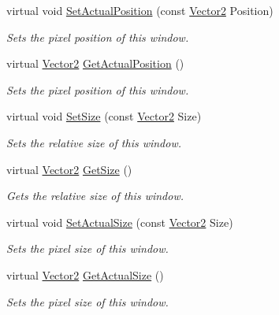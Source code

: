 \begin{DoxyCompactItemize}
virtual void \hyperlink{classphys_1_1UI_1_1Window_a2b8dfb4d8f2c730502ead6d1e8bb10e2}{SetActualPosition} (const \hyperlink{classphys_1_1Vector2}{Vector2} Position)
\begin{DoxyCompactList}\small\item\em Sets the pixel position of this window. \item\end{DoxyCompactList}\item 
virtual \hyperlink{classphys_1_1Vector2}{Vector2} \hyperlink{classphys_1_1UI_1_1Window_a811fb495bc698752e03778b18f2b1a30}{GetActualPosition} ()
\begin{DoxyCompactList}\small\item\em Sets the pixel position of this window. \item\end{DoxyCompactList}\item 
virtual void \hyperlink{classphys_1_1UI_1_1Window_aeaf0b107e6bcf688635dd4719871bd9a}{SetSize} (const \hyperlink{classphys_1_1Vector2}{Vector2} Size)
\begin{DoxyCompactList}\small\item\em Sets the relative size of this window. \item\end{DoxyCompactList}\item 
virtual \hyperlink{classphys_1_1Vector2}{Vector2} \hyperlink{classphys_1_1UI_1_1Window_a9946100eb6e6e985921bbea9e87cede3}{GetSize} ()
\begin{DoxyCompactList}\small\item\em Gets the relative size of this window. \item\end{DoxyCompactList}\item 
virtual void \hyperlink{classphys_1_1UI_1_1Window_a1b9832e05d8c15a30a2ac12cc1ebb255}{SetActualSize} (const \hyperlink{classphys_1_1Vector2}{Vector2} Size)
\begin{DoxyCompactList}\small\item\em Sets the pixel size of this window. \item\end{DoxyCompactList}\item 
virtual \hyperlink{classphys_1_1Vector2}{Vector2} \hyperlink{classphys_1_1UI_1_1Window_a22f5ca800e44c5e2cfeed59c243b03ed}{GetActualSize} ()
\begin{DoxyCompactList}\small\item\em Sets the pixel size of this window. \item\end{DoxyCompactList}\item 

\end{DoxyCompactItemize}
